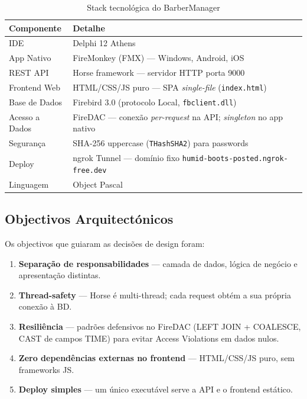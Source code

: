 \documentclass[12pt,a4paper]{article}
\begin{document}
\begin{table}[H]
\centering
\caption{Stack tecnológica do BarberManager}
\begin{tabular}{@{}lp{9cm}@{}}
\toprule
\textbf{Componente} & \textbf{Detalhe} \\
\midrule
IDE & Delphi 12 Athens \\
App Nativo & FireMonkey (FMX) — Windows, Android, iOS \\
REST API & Horse framework — servidor HTTP porta 9000 \\
Frontend Web & HTML/CSS/JS puro — SPA \textit{single-file} (\texttt{index.html}) \\
Base de Dados & Firebird 3.0 (protocolo Local, \texttt{fbclient.dll}) \\
Acesso a Dados & FireDAC — conexão \textit{per-request} na API; \textit{singleton} no app nativo \\
Segurança & SHA-256 uppercase (\texttt{THashSHA2}) para passwords \\
Deploy & ngrok Tunnel — domínio fixo \texttt{humid-boots-posted.ngrok-free.dev} \\
Linguagem & Object Pascal \\
\bottomrule
\end{tabular}
\end{table}

\subsection{Objectivos Arquitectónicos}

Os objectivos que guiaram as decisões de design foram:

\begin{enumerate}
  \item \textbf{Separação de responsabilidades} — camada de dados, lógica de negócio e apresentação distintas.
  \item \textbf{Thread-safety} — Horse é multi-thread; cada request obtém a sua própria conexão à BD.
  \item \textbf{Resiliência} — padrões defensivos no FireDAC (LEFT JOIN + COALESCE, CAST de campos TIME) para evitar Access Violations em dados nulos.
  \item \textbf{Zero dependências externas no frontend} — HTML/CSS/JS puro, sem frameworks JS.
  \item \textbf{Deploy simples} — um único executável serve a API e o frontend estático.
\end{enumerate}
\end{document}
